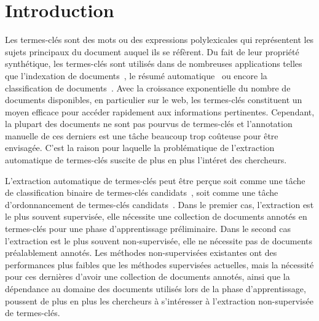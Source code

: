 \section{Introduction}
\label{sec:introduction}
  Les termes-clés sont des mots ou des expressions polylexicales qui représentent les sujets principaux du document auquel ils se réfèrent.
  Du fait de leur propriété synthétique, les termes-clés sont utilisés dans de nombreuses applications telles que l'indexation de documents~\cite{medelyan2008smalltrainingset}, le résumé automatique~\cite{litvak2008graphbased} ou encore la classification de documents~\cite{han2007webdocumentclustering}.
  Avec la croissance exponentielle du nombre de documents disponibles, en particulier sur le web, les termes-clés constituent un moyen efficace pour accéder rapidement aux informations pertinentes.
  Cependant, la plupart des documents ne sont pas pourvus de termes-clés et l'annotation manuelle de ces derniers est une tâche beaucoup trop coûteuse pour être envisagée.
  C'est la raison pour laquelle la problématique de l'extraction automatique de termes-clés suscite de plus en plus l'intéret des chercheurs.

  L'extraction automatique de termes-clés peut être perçue soit comme une tâche
  de classification binaire de termes-clés candidats~\cite{witten1999kea}, soit
  comme une tâche d'ordonnancement de termes-clés
  candidats~\cite{mihalcea2004textrank}. Dans le premier cas, l'extraction est
  le plus souvent supervisée, elle nécessite une collection de documents annotés
  en termes-clés pour une phase d'apprentissage préliminaire. Dans le second cas
  l'extraction est le plus souvent non-supervisée, elle ne nécessite pas de
  documents préalablement annotés. Les méthodes non-supervisées existantes ont
  des performances plus faibles que les méthodes supervisées actuelles, mais la
  nécessité pour ces dernières d'avoir une collection de documents annotés,
  ainsi que la dépendance au domaine des documents utilisés lors de la phase
  d'apprentissage, poussent de plus en plus les chercheurs à s'intéresser à
  l'extraction non-supervisée de termes-clés.

